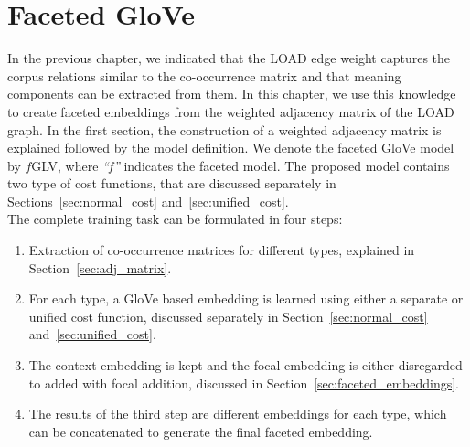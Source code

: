 \section{Faceted GloVe}\label{sec:faceted_glove}
In the previous chapter, we indicated that the LOAD edge weight captures the corpus relations similar to the co-occurrence matrix and that meaning components can be extracted from them. In this chapter, we use this knowledge to create faceted embeddings from the weighted adjacency matrix of the LOAD graph. In the first section, the construction of a weighted adjacency matrix is explained followed by the model definition. We denote the faceted GloVe model by $f$GLV, where \emph{``f''} indicates the faceted model. The proposed model contains two type of cost functions, that are discussed separately in Sections~\ref{sec:normal_cost} and~\ref{sec:unified_cost}. \\
The complete training task can be formulated in four steps: 
 \begin{enumerate}        
 \item Extraction of co-occurrence matrices for different types, explained in Section~\ref{sec:adj_matrix}. 
 \item For each type, a GloVe based embedding is learned using either a separate or unified cost function, discussed separately in Section~\ref{sec:normal_cost} and~\ref{sec:unified_cost}. 
 \item The context embedding is kept and the focal embedding is either disregarded to added with focal addition, discussed in Section~\ref{sec:faceted_embeddings}.
 \item The results of the third step are different embeddings for each type, which can be concatenated to generate the final faceted embedding. 
 \end{enumerate}
